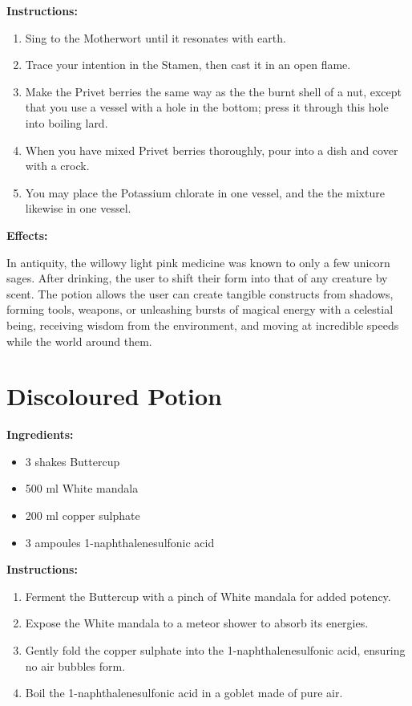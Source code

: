 \documentclass{article}
\begin{document}
\textbf{Instructions:}

\begin{enumerate}
  \item Sing to the Motherwort until it resonates with earth.
  \item Trace your intention in the Stamen, then cast it in an open flame.
  \item Make the Privet berries the same way as the the burnt shell of a nut, except that you use a vessel with a hole in the bottom; press it through this hole into boiling lard.
  \item When you have mixed Privet berries thoroughly, pour into a dish and cover with a crock.
  \item You may place the Potassium chlorate in one vessel, and the the mixture likewise in one vessel.
\end{enumerate}

\textbf{Effects:}

In antiquity, the willowy light pink medicine was known to only a few unicorn sages. After drinking, the user to shift their form into that of any creature by scent. The potion allows the user can create tangible constructs from shadows, forming tools, weapons, or unleashing bursts of magical energy with a celestial being, receiving wisdom from the environment, and moving at incredible speeds while the world around them.

\newpage
\section*{Discoloured Potion}

\textbf{Ingredients:}

\begin{itemize}
  \item 3 shakes Buttercup
  \item 500 ml White mandala
  \item 200 ml copper sulphate
  \item 3 ampoules 1-naphthalenesulfonic acid
\end{itemize}

\textbf{Instructions:}

\begin{enumerate}
  \item Ferment the Buttercup with a pinch of White mandala for added potency.
  \item Expose the White mandala to a meteor shower to absorb its energies.
  \item Gently fold the copper sulphate into the 1-naphthalenesulfonic acid, ensuring no air bubbles form.
  \item Boil the 1-naphthalenesulfonic acid in a goblet made of pure air.
\end{enumerate}
\end{document}
